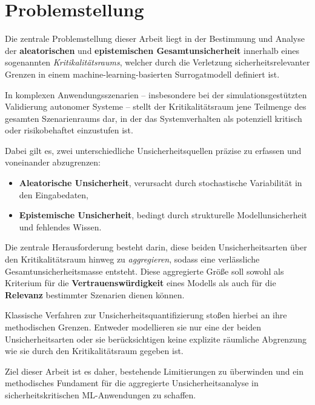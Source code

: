 
\chapter{Problemstellung}
\label{chapter:problemstellung}

Die zentrale Problemstellung dieser Arbeit liegt in der Bestimmung und Analyse der \textbf{aleatorischen} und \textbf{epistemischen Gesamtunsicherheit} innerhalb eines sogenannten \emph{Kritikalitätsraums}, welcher durch die Verletzung sicherheitsrelevanter Grenzen in einem machine-learning-basierten Surrogatmodell definiert ist.

In komplexen Anwendungsszenarien – insbesondere bei der simulationsgestützten Validierung autonomer Systeme – stellt der Kritikalitätsraum jene Teilmenge des gesamten Szenarienraums dar, in der das Systemverhalten als potenziell kritisch oder risikobehaftet einzustufen ist.

Dabei gilt es, zwei unterschiedliche Unsicherheitsquellen präzise zu erfassen und voneinander abzugrenzen:

\begin{itemize}
  \item \textbf{Aleatorische Unsicherheit}, verursacht durch stochastische Variabilität in den Eingabedaten,
  \item \textbf{Epistemische Unsicherheit}, bedingt durch strukturelle Modellunsicherheit und fehlendes Wissen.
\end{itemize}

Die zentrale Herausforderung besteht darin, diese beiden Unsicherheitsarten über den Kritikalitätsraum hinweg zu \emph{aggregieren}, sodass eine verlässliche Gesamtunsicherheitsmasse entsteht. Diese aggregierte Größe soll sowohl als Kriterium für die \textbf{Vertrauenswürdigkeit} eines Modells als auch für die \textbf{Relevanz} bestimmter Szenarien dienen können.

Klassische Verfahren zur Unsicherheitsquantifizierung stoßen hierbei an ihre methodischen Grenzen. Entweder modellieren sie nur eine der beiden Unsicherheitsarten oder sie berücksichtigen keine explizite räumliche Abgrenzung wie sie durch den Kritikalitätsraum gegeben ist.

Ziel dieser Arbeit ist es daher, bestehende Limitierungen zu überwinden und ein methodisches Fundament für die aggregierte Unsicherheitsanalyse in sicherheitskritischen ML-Anwendungen zu schaffen.



